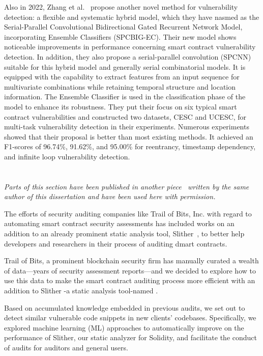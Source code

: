 Also in 2022, Zhang et al.~\cite{zhang2022spcbig} propose another novel method for vulnerability detection:
a flexible and systematic hybrid model, which they have nasmed as the Serial-Parallel Convolutional Bidirectional Gated
Recurrent Network Model, incorporating Ensemble Classifiers (SPCBIG-EC).
Their new model shows noticeable improvements in performance concerning smart contract vulnerability detection.
In addition, they also propose a serial-parallel convolution (SPCNN) suitable for this hybrid model and generally serial combinatorial models.
It is equipped with the capability to extract features from an input sequence for multivariate combinations while retaining temporal structure and location information.
The Ensemble Classifier is used in the classification phase of the model to enhance its
robustness. They put their focus on six typical smart contract vulnerabilities and constructed two
datasets, CESC and UCESC, for multi-task vulnerability detection in their experiments.
Numerous experiments showed that their proposal is better than most existing methods.
It achieved an F1-scores of 96.74\%, 91.62\%, and 95.00\% for reentrancy, timestamp
dependency, and infinite loop vulnerability detection.

\section{\slithersimil}

\textit{Parts of this section have been published in another piece~\cite{pilehchiha_2020} written by the same author of this dissertation and have been used here with permission.}

The efforts of security auditing companies like Trail of Bits, Inc. with regard to automating smart contract security assessments has included works on an addition to an already prominent static analysis tool, Slither~\cite{slither}, to better help developers and researchers in their process of auditing dmart contracts.

Trail of Bits, a prominent blockchain security firm has manually curated a wealth of data—years of security assessment reports—and we decided to explore how to use this data to make the smart
contract auditing process more efficient with an addition to Slither -a static analysis tool-named \slithersimil.

Based on accumulated knowledge embedded in previous audits, we set out to detect similar vulnerable code snippets in new clients' codebases.
Specifically, we explored machine learning (ML) approaches to automatically improve on the performance of Slither, our static analyzer for Solidity, and facilitate the conduct of audits for auditors and general users.

